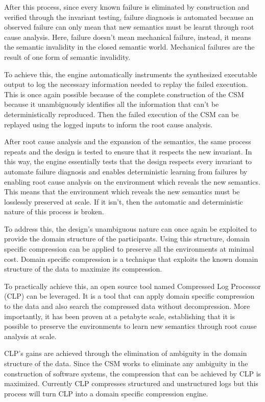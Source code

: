 After this process, since every known failure is eliminated by construction and verified through the invariant testing, failure diagnosis is automated because an observed failure can only mean that new semantics must be learnt through root cause analysis. Here, failure doesn't mean mechanical failure, instead, it means the semantic invalidity in the closed semantic world. Mechanical failures are the result of one form of semantic invalidity.

To achieve this, the engine automatically instruments the synthesized executable output to log the necessary information needed to replay the failed execution. This is once again possible because of the complete construction of the CSM because it unambiguously identifies all the information that can't be deterministically reproduced. Then the failed execution of the CSM can be replayed using the logged inputs to inform the root cause analysis.

After root cause analysis and the expansion of the semantics, the same process repeats and the design is tested to ensure that it respects the new invariant. In this way, the engine essentially tests that the design respects every invariant to automate failure diagnosis and enables deterministic learning from failures by enabling root cause analysis on the environment which reveals the new semantics. This means that the environment which reveals the new semantics must be losslessly preserved at scale. If it isn't, then the automatic and deterministic nature of this process is broken.

To address this, the design's unambiguous nature can once again be exploited to provide the domain structure of the participants. Using this structure, domain specific compression can be applied to preserve all the environments at minimal cost. Domain specific compression is a technique that exploits the known domain structure of the data to maximize its compression.

To practically achieve this, an open source tool named Compressed Log Processor (CLP) can be leveraged. It is a tool that can apply domain specific compression to the data and also search the compressed data without decompression. More importantly, it has been proven at a petabyte scale, establishing that it is possible to preserve the environments to learn new semantics through root cause analysis at scale.

CLP’s gains are achieved through the elimination of ambiguity in the domain structure of the data. Since the CSM works to eliminate any ambiguity in the construction of software systems, the compression that can be achieved by CLP is maximized. Currently CLP compresses structured and unstructured logs but this process will turn CLP into a domain specific compression engine. 

